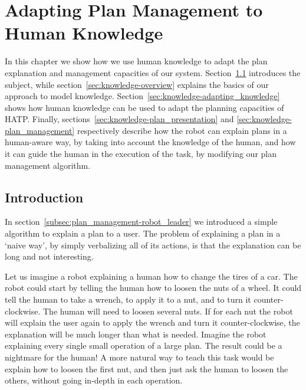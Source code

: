 \chapter{Adapting Plan Management to Human Knowledge} %

\label{chapter:knowledge} %



  
In this chapter we show how we use human knowledge to adapt the plan explanation and management capacities of our system. Section~\ref{sec:knowledge-intro} introduces the subject, while section~\ref{sec:knowledge-overview} explains the basics of our approach to model knowledge. Section~\ref{sec:knowledge-adapting_knowledge} shows how human knowledge can be used to adapt the planning capacities of HATP. Finally, sections~\ref{sec:knowledge-plan_presentation} and \ref{sec:knowledge-plan_management} respectively describe how the robot can explain plans in a human-aware way, by taking into account the knowledge of the human, and how it can guide the human in the execution of the task, by modifying our plan management algorithm.


\section{Introduction}
\label{sec:knowledge-intro}

In section~\ref{subsec:plan_management-robot_leader} we introduced a simple algorithm to explain a plan to a user. The problem of explaining a plan in a `naive way', by simply verbalizing all of its actions, is that the explanation can be long and not interesting. 

Let us imagine a robot explaining a human how to change the tires of a car. The robot could start by telling the human how to loosen the nuts of a wheel. It could tell the human to take a wrench, to apply it to a nut, and to turn it counter-clockwise. The human will need to loosen several nuts. If for each nut the robot will explain the user again to apply the wrench and turn it counter-clockwise, the explanation will be much longer than what is needed. Imagine the robot explaining every single small operation of a large plan. The result could be a nightmare for the human! A more natural way to teach this task would be explain how to loosen the first nut, and then just ask the human to loosen the others, without going in-depth in each operation.

